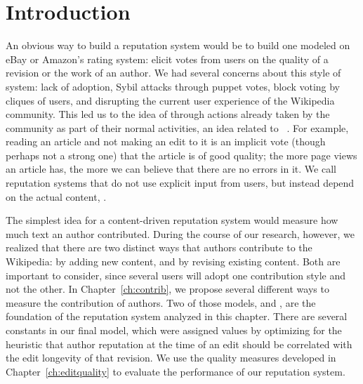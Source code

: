 \section{Introduction}

An obvious way to build a reputation system would be to build one
modeled on eBay or Amazon's rating system: elicit votes from users
on the quality of a revision or the work of an author.
We had several concerns about this style of system: lack of adoption,
Sybil attacks through puppet votes, block voting by cliques of users, and
disrupting the current user experience of the Wikipedia community.
This led us to the idea of  through
actions already taken by the community as part of their normal activities,
an idea related to ~\cite{Samuelson1938}.
For example, reading an article and not making an edit to it is
an implicit vote (though perhaps not a strong one)
that the article is of good quality; the more page views an article
has, the more we can believe that there are no errors in it.
We call reputation systems that do not use explicit input
from users, but instead depend on the actual content, .


The simplest idea for a content-driven reputation system would measure
how much text an author contributed.
During the course of our research, however, we realized that there are
two distinct ways that authors contribute to the Wikipedia: by adding
new content, and by revising existing content.
Both are important to consider, since several users will
adopt one contribution style and not the other.
In Chapter~\ref{ch:contrib}, we propose several different ways
to measure the contribution of authors.
Two of those models, \tenrevs and \editlong,
are the foundation of the reputation system analyzed
in this chapter.
There are several constants in our final model, which were assigned
values by optimizing for the heuristic that author reputation at
the time of an edit
should be correlated with the edit longevity of that revision.
We use the quality measures developed in Chapter~\ref{ch:editquality}
to evaluate the performance of our reputation system.

\begin{comment}
We introduce in Chapter~\ref{ch:editquality} the notions of
\intro{text longevity}, which describes how added text survives
into later revisions, and \intro{edit longevity}, which measures
how consistent an edit is with later revisions,
to account for these different methods of contribution.
We use the principle that every future author is
implicitly making an evaluation on the work of past authors:
edits and new text that are preserved with later revisions
are judged ``good'' by the community.
\end{comment}


